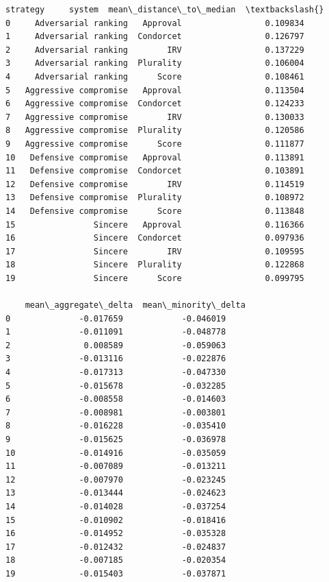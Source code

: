\documentclass[11pt]{article}
\makeatletter
\newcommand{\boxspacing}{\kern\kvtcb@left@rule\kern\kvtcb@boxsep}
\newcommand{\prompt}[4]{
        {\ttfamily\llap{{\color{#2}[#3]:\hspace{3pt}#4}}\vspace{-\baselineskip}}
    }
\makeatother
\begin{document}
            \begin{tcolorbox}[breakable, size=fbox, boxrule=.5pt, pad at break*=1mm, opacityfill=0]
\prompt{Out}{outcolor}{33}{\boxspacing}
\begin{Verbatim}[commandchars=\\\{\}]
                 strategy     system  mean\_distance\_to\_median  \textbackslash{}
0     Adversarial ranking   Approval                 0.109834
1     Adversarial ranking  Condorcet                 0.126797
2     Adversarial ranking        IRV                 0.137229
3     Adversarial ranking  Plurality                 0.106004
4     Adversarial ranking      Score                 0.108461
5   Aggressive compromise   Approval                 0.113504
6   Aggressive compromise  Condorcet                 0.124233
7   Aggressive compromise        IRV                 0.130033
8   Aggressive compromise  Plurality                 0.120586
9   Aggressive compromise      Score                 0.111877
10   Defensive compromise   Approval                 0.113891
11   Defensive compromise  Condorcet                 0.103891
12   Defensive compromise        IRV                 0.114519
13   Defensive compromise  Plurality                 0.108972
14   Defensive compromise      Score                 0.113848
15                Sincere   Approval                 0.116366
16                Sincere  Condorcet                 0.097936
17                Sincere        IRV                 0.109595
18                Sincere  Plurality                 0.122868
19                Sincere      Score                 0.099795

    mean\_aggregate\_delta  mean\_minority\_delta
0              -0.017659            -0.046019
1              -0.011091            -0.048778
2               0.008589            -0.059063
3              -0.013116            -0.022876
4              -0.017313            -0.047330
5              -0.015678            -0.032285
6              -0.008558            -0.014603
7              -0.008981            -0.003801
8              -0.016228            -0.035410
9              -0.015625            -0.036978
10             -0.014916            -0.035059
11             -0.007089            -0.013211
12             -0.007970            -0.023245
13             -0.013444            -0.024623
14             -0.014028            -0.037254
15             -0.010902            -0.018416
16             -0.014952            -0.035328
17             -0.012432            -0.024837
18             -0.007185            -0.020354
19             -0.015403            -0.037871
\end{Verbatim}
\end{tcolorbox}
        
\end{document}
